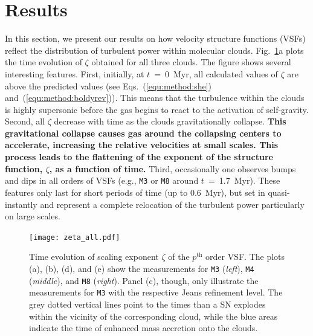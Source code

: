 \section{Results}\label{results}

In this section, we present our results on how velocity structure functions (VSFs) reflect the distribution of turbulent power within molecular clouds.
Fig.~\ref{pic:results:zeta_all}a plots the time evolution of $\zeta$ obtained for all three clouds.
The figure shows several interesting features.
First, initially, at $t$~=~0~Myr, all calculated values of $\zeta$ are above the predicted values (see Eqs.~(\ref{equ:method:she}) and~(\ref{equ:method:boldyrev})).
This means that the turbulence within the clouds is highly supersonic before the gas begins to react to the activation of self-gravity.
Second, all $\zeta$ decrease with time as the clouds gravitationally collapse.
\textbf{This gravitational collapse causes gas around the collapsing centers to accelerate, increasing the relative velocities at small scales. This process leads to the flattening of the exponent of the structure function, $\zeta$, as a function of time. }
Third, occasionally one observes bumps and dips in all orders of VSFs (e.g., \texttt{M3} or \texttt{M8} around $t$~=~1.7~Myr). 
These features only last for short periods of time (up to 0.6~Myr), but set in quasi-instantly and represent a complete relocation of the turbulent power particularly on large scales. 

\begin{figure}[!htb]
	\centering
	\texttt{[image: zeta\_all.pdf]}
	\caption{ Time evolution of scaling exponent $\zeta$ of the $p^\mathrm{th}$ order VSF. The plots (a), (b), (d), and (e) show the measurements for \texttt{M3} (\textit{left}), \texttt{M4} (\textit{middle}), and \texttt{M8} (\textit{right}). Panel (c), though, only illustrate the measurements for \texttt{M3} with the respective Jeans refinement level. The grey dotted vertical lines point to the times than a SN explodes within the vicinity of the corresponding cloud, while the blue areas indicate the time of enhanced mass accretion onto the clouds.
	}
	\label{pic:results:zeta_all}
\end{figure}

